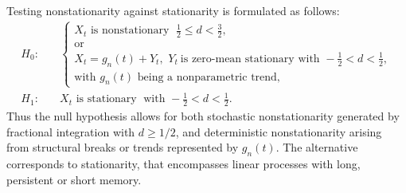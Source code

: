 \documentclass[12pt]{article}
\numberwithin{equation}{section}
\begin{document}
Testing nonstationarity against stationarity is formulated as follows:
\[
\begin{aligned}
H_0:\quad &
\left\{
\begin{array}{l}
X_t\textrm{ is nonstationary } \; \tfrac12 \le d < \tfrac32, \\
\text{or} \\
X_t=g_n(t)+Y_t,\,\, Y_t\ \textrm{is zero-mean stationary with } -\tfrac12 < d < \tfrac12,\\
\textrm{with }g_n(t)\textrm{ being a nonparametric trend,}
\end{array}
\right.
\\[1em]
H_1:\quad & X_t\textrm{ is stationary }\;\textrm{with } -\tfrac12 < d < \tfrac12.
\end{aligned}
\]
Thus the null hypothesis allows for both stochastic nonstationarity generated by fractional integration with $d \ge 1/2$, and deterministic nonstationarity arising from structural breaks or trends represented by $g_n(t)$. The alternative corresponds to stationarity, that encompasses linear processes with long, persistent or short memory.
\end{document}
